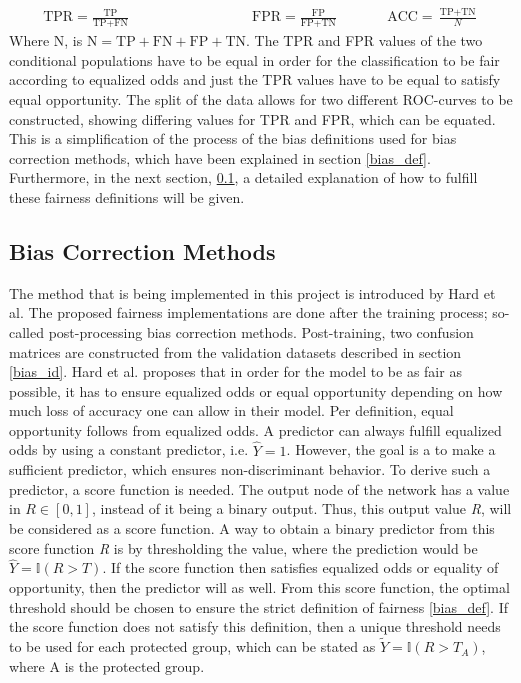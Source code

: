 \documentclass[11pt, fleqn, titlepage]{article}
\begin{document}
	\begin{align}\label{tpr_fpr_acc}
	\text{TPR} = \frac{\text{TP}}{\text{TP}+\text{FN}}\qquad \qquad \qquad \qquad &
	\text{FPR} = \frac{\text{FP}}{\text{FP}+\text{TN}} \qquad &&
	\text{ACC} = \frac{\text{TP}+\text{TN}}{N}
	\end{align} \noindent
	Where N, is $ \text{N} = \text{TP}+\text{FN}+\text{FP}+\text{TN} $. The TPR and FPR values of the two conditional populations have to be equal in order for the classification to be fair according to equalized odds and just the TPR values have to be equal to satisfy equal opportunity. The split of the data allows for two different ROC-curves to be constructed, showing differing values for TPR and FPR, which can be equated. This is a simplification of the process of the bias definitions used for bias correction methods, which have been explained in section \ref{bias_def}. Furthermore, in the next section, \ref{biascorr}, a detailed explanation of how to fulfill these fairness definitions will be given. 
	
	\subsection{Bias Correction Methods}\label{biascorr}
	
	The method that is being implemented in this project is introduced by Hard et al. \cite{equal_of_oppor} The proposed fairness implementations are done after the training process; so-called post-processing bias correction methods. Post-training, two confusion matrices are constructed from the validation datasets described in section \ref{bias_id}. Hard et al. proposes that in order for the model to be as fair as possible, it has to ensure equalized odds or equal opportunity depending on how much loss of accuracy one can allow in their model. Per definition, equal opportunity follows from equalized odds. A predictor can always fulfill equalized odds by using a constant predictor, i.e. $ \hat Y = 1 $. However, the goal is a to make a sufficient predictor, which ensures non-discriminant behavior. To derive such a predictor, a score function is needed. The output node of the network has a value in $ R \in [0,1] $, instead of it being a binary output. Thus, this output value \textit{R}, will be considered as a score function. A way to obtain a binary predictor from this score function \textit{R} is by thresholding the value, where the prediction would be $ \hat Y = \mathbb I (R > T) $. If the score function then satisfies equalized odds or equality of opportunity, then the predictor will as well. From this score function, the optimal threshold should be chosen to ensure the strict definition of fairness \ref{bias_def}. If the score function does not satisfy this definition, then a unique threshold needs to be used for each protected group, which can be stated as $ \tilde Y = \mathbb I ( R > T_A)$, where A is the protected group. 
	
\end{document}
